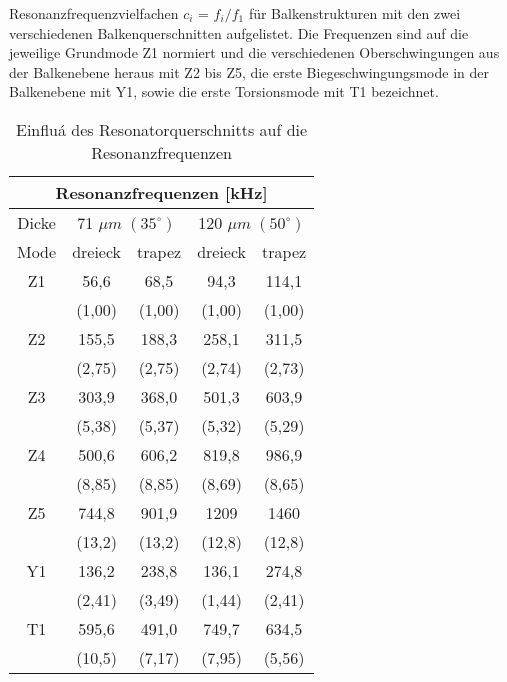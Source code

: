 Resonanzfrequenzvielfachen $c_{i}$ = $f_{i}/f_{1}$ für Balkenstrukturen mit
den zwei verschiedenen Balkenquerschnitten aufgelistet. Die Frequenzen sind
auf die jeweilige Grundmode Z1 normiert und die verschiedenen
Oberschwingungen aus der Balkenebene heraus mit Z2 bis Z5, die erste
Biegeschwingungsmode in der Balkenebene mit Y1, sowie die erste
Torsionsmode mit T1 bezeichnet.
\begin{table}[htb]
\caption{\label{tabresquersch}
 Einfluá des Resonatorquerschnitts auf die Resonanzfrequenzen}
\begin{center}
\begin{tabular}{|c||c|c||c|c|}
\hline
\multicolumn{5}{|c|}{Resonanzfrequenzen [kHz]}\\
\hline \hline
Dicke   & \multicolumn{2}{c||}{ 71 $ \mu m \;
(35^{\circ}) $ } & \multicolumn{2}{c|}{ 120 $ \mu m \; (50^{\circ}) $} \\
\hline \hline
 Mode   &  dreieck & trapez & dreieck & trapez \\[2.5ex]
\hline \hline
 Z1  &  56,6   & 68,5    & 94,3    & 114,1 \\
     &  (1,00) & (1,00)  & (1,00)  & (1,00) \\ \hline
 Z2  & 155,5   & 188,3   & 258,1   & 311,5 \\
     & (2,75)  & (2,75)  & (2,74)  & (2,73) \\ \hline
 Z3  & 303,9   & 368,0   & 501,3   & 603,9 \\
     & (5,38)  & (5,37)  & (5,32)  & (5,29) \\ \hline
 Z4  & 500,6   & 606,2   & 819,8   & 986,9 \\
     & (8,85)  & (8,85)  & (8,69)  & (8,65) \\ \hline
 Z5  & 744,8   & 901,9   & 1209    & 1460 \\
     & (13,2)  & (13,2)  & (12,8)  & (12,8) \\
\hline \hline
 Y1  & 136,2   & 238,8   & 136,1   & 274,8 \\
     & (2,41)  & (3,49)  & (1,44)  & (2,41) \\
\hline \hline
 T1  & 595,6   & 491,0   & 749,7   & 634,5 \\
     & (10,5)  & (7,17)  & (7,95)  & (5,56) \\ \hline
\end{tabular}
\end{center}
\end{table}
